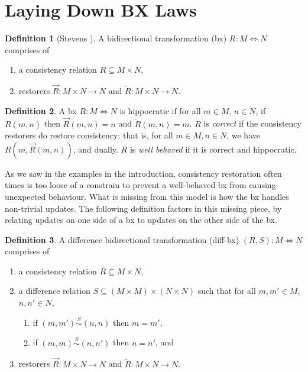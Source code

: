 \documentclass[acmsmall,review,anonymous]{acmart}\settopmatter{printfolios=true,printccs=false,printacmref=false}
\theoremstyle{definition}
\newtheorem{definition}{Definition}
\begin{document}
\section{Laying Down BX Laws}
\begin{definition}[Stevens \cite{stevens2010bidirectional}]
A bidirectional transformation (bx) $R : M \Leftrightarrow N$ comprises of 
\begin{enumerate}
\item
a consistency relation $R \subseteq M \times N$,
\item
restorers $\overrightarrow{R} : M \times N \rightarrow N$ and $\overleftarrow{R} : M \times N \longrightarrow
N$.
\end{enumerate}
\end{definition}

\begin{definition}
A bx $R : M \Leftrightarrow N$ is hippocratic if for all $m \in M$, $n \in N$, if $R(m, n)$ then $\overrightarrow{R}(m, n) = n$ and $\overleftarrow{R}(m,n) = m$. $R$ is {\em correct} if the consistency restorers do restore consistency: that is, for all $m \in M, n \in N$, we have $R(m, \overrightarrow{R}(m, n))$, and dually. $R$ is {\em well behaved} if it is correct and hippocratic.
\end{definition}
As we saw in the examples in the introduction, consistency restoration often times is too loose of a constrain to prevent a well-behaved bx from causing unexpected behaviour. What is missing from this model is how the bx handles non-trivial updates. The following definition factors in this missing piece, by relating updates on one side of a bx to updates on the other side of the bx.
\begin{definition}
A difference bidirectional transformation (diff-bx) $(R,S) : M \Leftrightarrow N$ comprises of 
\begin{enumerate}
\item
a consistency relation $R \subseteq M \times N$,
\item
a difference relation $S \subseteq (M \times M) \times (N \times N)$ such that for all $m, m' \in M$, $n, n' \in N$,
\begin{enumerate}
\item
if $(m, m') \stackrel{S}{\sim} (n, n)$ then $m = m'$,
\item
if $(m, m) \stackrel{S}{\sim} (n, n')$ then $n = n'$, and
\end{enumerate}
\item
restorers $\overrightarrow{R} : M \times N \rightarrow N$ and $\overleftarrow{R} : M \times N \longrightarrow
N$.
\end{enumerate}
\end{definition}
\end{document}
